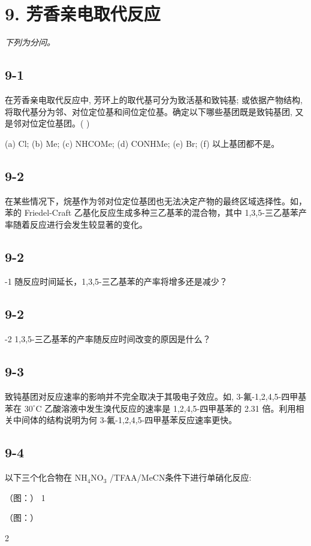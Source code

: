 \section*{9. 芳香亲电取代反应}
\textit{下列为分问。}

\subsection*{9-1}
在芳香亲电取代反应中, 芳环上的取代基可分为致活基和致钝基; 或依据产物结构, 将取代基分为邻、对位定位基和间位定位基。确定以下哪些基团既是致钝基团, 又是邻对位定位基团。(   )

(a) Cl; (b) Me; (c) NHCOMe; (d) CONHMe; (e) Br; (f) 以上基团都不是。

\subsection*{9-2}
在某些情况下，烷基作为邻对位定位基团也无法决定产物的最终区域选择性。如，苯的 Friedel-Craft 乙基化反应生成多种三乙基苯的混合物，其中 1,3,5-三乙基苯产率随着反应进行会发生较显著的变化。

\subsection*{9-2}
-1 随反应时间延长，1,3,5-三乙基苯的产率将增多还是减少？

\subsection*{9-2}
-2 1,3,5-三乙基苯的产率随反应时间改变的原因是什么？

\subsection*{9-3}
致钝基团对反应速率的影响并不完全取决于其吸电子效应。如, 3-氟-1,2,4,5-四甲基苯在 $30^{\circ} \mathrm{C}$ 乙酸溶液中发生溴代反应的速率是 1,2,4,5-四甲基苯的 2.31 倍。利用相关中间体的结构说明为何 3-氟-1,2,4,5-四甲基苯反应速率更快。

\subsection*{9-4}
以下三个化合物在 $\mathrm{NH_4NO_3}$ /TFAA/MeCN条件下进行单硝化反应:

（图：）
1

（图：）

2

